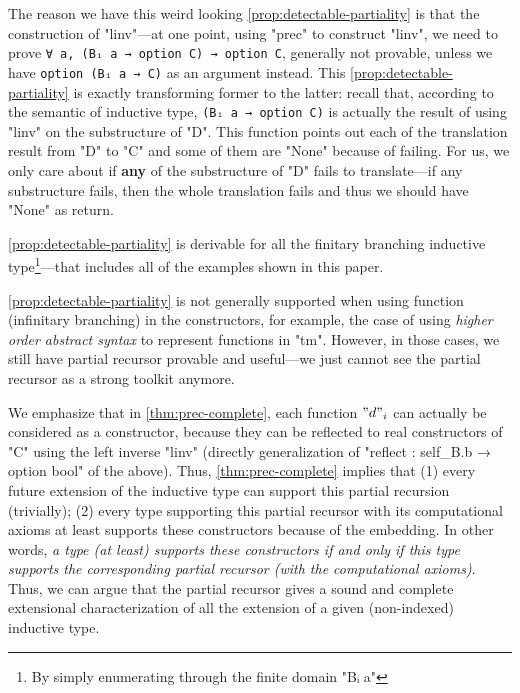 The reason we have this weird looking \ref{prop:detectable-partiality}
is that the construction of "linv"---at one point, using "prec" to
construct "linv", we need to prove \texttt{∀ a, (Bᵢ a → option
C) → option C}, generally not provable, unless we have
\texttt{option (Bᵢ a → C)} as an argument instead.
This \ref{prop:detectable-partiality} is exactly transforming former to
the latter:
recall that, according to the semantic of inductive type,
\texttt{(Bᵢ a → option C)} is actually the result of using
"linv" on the substructure of "D". This function points out each of the
translation result from "D" to "C" and some of them are "None" because
of failing. For us, we only care about if \textbf{any} of the
substructure of "D" fails to translate---if any substructure fails,
then the whole translation fails and thus we should have "None" as
return.

\ref{prop:detectable-partiality} is derivable for all the finitary branching inductive type\footnote{By simply enumerating through the finite domain "Bᵢ a"}---that includes all of the examples shown in this paper. 

\ref{prop:detectable-partiality} is not generally supported when using function (infinitary branching) in the constructors, for example, the case of using \textit{higher order abstract syntax} to represent functions in "tm". However, in those cases, we still have partial recursor provable and useful---we just cannot see the partial recursor as a strong toolkit anymore.


We emphasize that in \cref{thm:prec-complete}, each function $"d"_i$ can
actually be considered as a constructor, because they can be reflected
to real constructors of "C" using the left inverse "linv" (directly generalization of "reflect : self_B.b → option bool" of the above). Thus, \cref{thm:prec-complete}
implies that (1) every future extension of the inductive type can
support this partial recursion (trivially); (2) every type supporting
this partial recursor with its computational axioms at least supports
these constructors because of the embedding. In other words, \textit{a
type (at least) supports these constructors if and only if this type
supports the corresponding partial recursor (with the computational
axioms)}.  Thus, we can argue that the partial recursor gives a sound and
complete extensional characterization of all the extension of a given (non-indexed)
inductive type.

